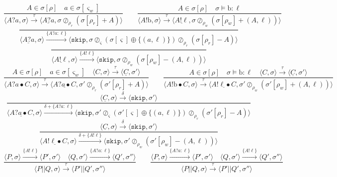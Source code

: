 \documentclass[times,10pt]{article}
\begin{document}
$$    %
    \frac{A \in \sigma[\rho] \quad a \in \sigma[\varsigma_w]}{\langle A?a, \sigma \rangle \xrightarrow{\tau} \langle \underline{A?a}, \sigma \oslash_{\rho_r} (\sigma[\rho_r] + A) \rangle} \qquad
    \frac{A \in \sigma[\rho] \quad \sigma \models \mathrm{b} : \ell}{\langle A!\mathrm{b}, \sigma \rangle \xrightarrow{\tau} \langle \underline{A!\ell}, \sigma \oslash_{\rho_w} (\sigma[\rho_w] + (A, \ell)) \rangle} $$$$
    \frac{}{\langle \underline{A?a}, \sigma \rangle \xrightarrow{\{A?a : \ell\}} \langle \mathtt{skip}, \sigma \oslash_\varsigma (\sigma[\varsigma] \oplus \{(a, \ell)\}) \oslash_{\rho_r} (\sigma[\rho_r] - A) \rangle} $$$$
    \frac{}{\langle \underline{A!\ell}, \sigma \rangle \xrightarrow{\{A!\ell\}} \langle \mathtt{skip}, \sigma \oslash_{\rho_w} (\sigma[\rho_w] - (A, \ell)) \rangle} $$$$
    \frac{A \in \sigma[\rho] \quad a \in \sigma[\varsigma_w] \quad \langle C, \sigma \rangle \xrightarrow{\tau} \langle \underline{C}, \sigma' \rangle}{\langle A?a \bullet C, \sigma \rangle \xrightarrow{\tau} \langle \underline{A?a \bullet C}, \sigma' \oslash_{\rho_r} (\sigma'[\rho_r] + A) \rangle} \qquad
    \frac{A \in \sigma[\rho] \quad \sigma \models \mathrm{b} : \ell \quad \langle C, \sigma \rangle \xrightarrow{\tau} \langle \underline{C}, \sigma' \rangle}{\langle A!\mathrm{b} \bullet C, \sigma \rangle \xrightarrow{\tau} \langle \underline{A!\ell \bullet C}, \sigma' \oslash_{\rho_w} (\sigma'[\rho_w] + (A, \ell)) \rangle} $$$$
    \frac{\langle \underline{C}, \sigma \rangle \xrightarrow{\delta} \langle \mathtt{skip}, \sigma' \rangle}{\langle \underline{A?a \bullet C}, \sigma \rangle \xrightarrow{\delta + \{A?a : \ell\}} \langle \mathtt{skip}, \sigma' \oslash_\varsigma (\sigma'[\varsigma] \oplus \{(a, \ell)\}) \oslash_{\rho_r} (\sigma'[\rho_r] - A) \rangle} $$$$
    \frac{\langle \underline{C}, \sigma \rangle \xrightarrow{\delta} \langle \mathtt{skip}, \sigma' \rangle}{\langle \underline{A!\ell \bullet C}, \sigma \rangle \xrightarrow{\delta + \{A!\ell\}} \langle \mathtt{skip}, \sigma' \oslash_{\rho_w} (\sigma'[\rho_w] - (A, \ell)) \rangle} $$$$
    \frac{\langle P, \sigma \rangle \xrightarrow{\{A!\ell\}} \langle P', \sigma' \rangle \quad \langle Q, \sigma' \rangle \xrightarrow{\{A?a : \ell\}} \langle Q', \sigma'' \rangle}{\langle P || Q, \sigma \rangle \xrightarrow{\tau} \langle P' || Q', \sigma'' \rangle} \qquad
    \frac{\langle P, \sigma \rangle \xrightarrow{\{A?a : \ell\}} \langle P', \sigma' \rangle \quad \langle Q, \sigma' \rangle \xrightarrow{\{A!\ell\}} \langle Q', \sigma'' \rangle}{\langle P || Q, \sigma \rangle \xrightarrow{\tau} \langle P' || Q', \sigma'' \rangle} $$$$
$$
\end{document}
